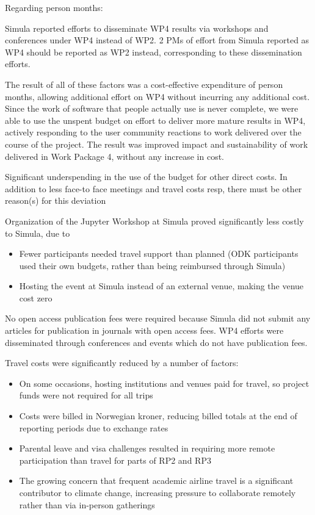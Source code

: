 Regarding person months:

Simula reported efforts to disseminate WP4 results via workshops and conferences under WP4 instead of WP2.
2 PMs of effort from Simula reported as WP4 should be reported as WP2 instead,
corresponding to these dissemination efforts.

The result of all of these factors was a cost-effective expenditure of person months,
allowing additional effort on WP4 without incurring any additional cost.
Since the work of software that people actually use is never complete,
we were able to use the unspent budget on effort to deliver more mature results in WP4,
actively responding to the user community reactions to work delivered over the course of the project.
The result was improved impact and sustainability of work delivered in Work Package 4,
without any increase in cost.

\begin{EUcomment}
  Significant underspending in the use of the budget for other direct
  costs. In addition to less face-to face meetings and travel costs
  resp, there must be other reason(s) for this deviation
\end{EUcomment}
Organization of the Jupyter Workshop at Simula proved significantly
less costly to Simula, due to
\begin{itemize}
    \item Fewer participants needed travel support than planned (ODK participants used their own budgets, rather than being reimbursed through Simula)
    \item Hosting the event at Simula instead of an external venue, making the venue cost zero
\end{itemize}

No open access publication fees were required because Simula did not submit any articles for publication in journals with open access fees.
WP4 efforts were disseminated through conferences and events which do not have publication fees.

Travel costs were significantly reduced by a number of factors:
\begin{itemize}
  \item On some occasions, hosting institutions and venues paid for travel, so project funds were not required for all trips
  \item Costs were billed in Norwegian kroner, reducing billed totals at the end of reporting periods due to exchange rates
  \item Parental leave and visa challenges resulted in requiring more remote participation
    than travel for parts of RP2 and RP3
  \item The growing concern that frequent academic airline travel is a significant contributor to climate change,
    increasing pressure to collaborate remotely rather than via in-person gatherings
\end{itemize}



